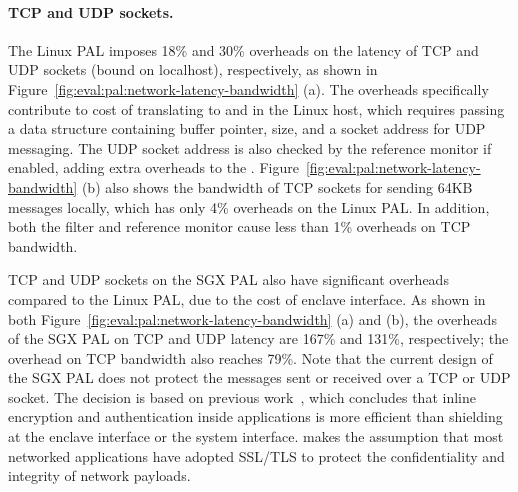 \paragraph{TCP and UDP sockets.}
The Linux PAL imposes \roughly{}18\% and \roughly{}30\% overheads
on the latency of TCP and UDP sockets (bound on localhost),
respectively,
as shown in
Figure~\ref{fig:eval:pal:network-latency-bandwidth} (a).
The overheads specifically contribute
to cost of translating to  and 
in the Linux host,
which requires passing a data structure
containing buffer pointer, size, and a socket address
for UDP messaging. 
The UDP socket address is also checked by the reference monitor if enabled, adding extra overheads to the \hostapis{}.
Figure~\ref{fig:eval:pal:network-latency-bandwidth} (b)
also shows the bandwidth of TCP sockets
for sending 64KB messages locally,
which has only 4\% overheads on the Linux PAL.
In addition, both the \seccomp{} filter and reference monitor
cause less than 1\% overheads
on TCP bandwidth.





TCP and UDP sockets on the SGX PAL
also have significant overheads compared to the Linux PAL,
due to the cost of enclave interface.
As shown in
both Figure~\ref{fig:eval:pal:network-latency-bandwidth}
(a) and (b),
the overheads of the SGX PAL on TCP and UDP latency
are \roughly{}167\% and \roughly{}131\%,
respectively; the overhead on TCP bandwidth also reaches \roughly{}79\%. 
Note that the current design
of the SGX PAL does not protect the messages sent or received
over a TCP or UDP socket.
The decision is based on previous work~\cite{osdi16scone},
which concludes that
inline encryption and authentication inside applications
is more efficient
than shielding at the enclave interface
or the system interface.
\graphenesgx{} makes the assumption
that most networked applications have adopted SSL/TLS
to protect the confidentiality and integrity of network payloads.



